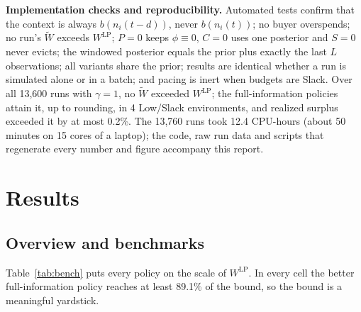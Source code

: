 \documentclass{article}
\newcommand{\WLP}{W^{\mathrm{LP}}}
\begin{document}
\textbf{Implementation checks and reproducibility.} Automated tests confirm that the context is always $b(n_i(t-d))$, never $b(n_i(t))$; no buyer overspends; no run's $\widetilde W$ exceeds $\WLP$; $P=0$ keeps $\phi\equiv0$, $C=0$ uses one posterior and $S=0$ never evicts; the windowed posterior equals the prior plus exactly the last $L$ observations; all variants share the prior; results are identical whether a run is simulated alone or in a batch; and pacing is inert when budgets are Slack. Over all 13,600 runs with $\gamma=1$, no $\widetilde W$ exceeded $\WLP$; the full-information policies attain it, up to rounding, in 4 Low/Slack environments, and realized surplus exceeded it by at most 0.2\%. The 13,760 runs took 12.4 CPU-hours (about 50 minutes on 15 cores of a laptop); the code, raw run data and scripts that regenerate every number and figure accompany this report.

\section{Results}
\label{sec:results}
\subsection{Overview and benchmarks}
\label{sec:overview}
Table~\ref{tab:bench} puts every policy on the scale of $\WLP$. In every cell the better full-information policy reaches at least 89.1\% of the bound, so the bound is a meaningful yardstick.
\end{document}
